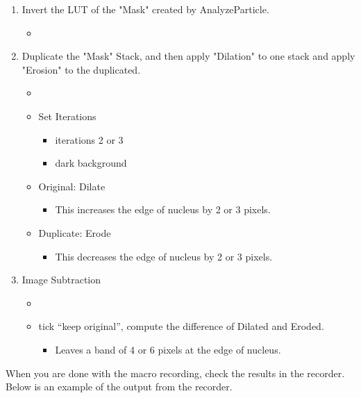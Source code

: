 \begin{enumerate}
\begin{itemize}
  \end{itemize}
  \item Invert the LUT of the "Mask" created by AnalyzeParticle. 
  \begin{itemize}
    \item {}
  \end{itemize}
  \item Duplicate the "Mask" Stack, and then apply "Dilation" to one stack and apply "Erosion" to the duplicated.
  \begin{itemize}
    \item {}
    \item Set Iterations 
    \begin{itemize}
      \item iterations 2 or 3
      \item dark background
    \end{itemize}
    \item Original: Dilate 
    \begin{itemize}
      \item This increases the edge of nucleus by 2 or 3 pixels. 
    \end{itemize}
    \item Duplicate: Erode 
    \begin{itemize}
      \item This decreases the edge of nucleus by 2 or 3 pixels. 
    \end{itemize}
  \end{itemize}
  \item Image Subtraction
  \begin{itemize}
    \item {}
    \item tick ``keep original'', compute the difference of Dilated and Eroded.
    \begin{itemize}
      \item Leaves a band of 4 or 6 pixels at the edge of nucleus. 
    \end{itemize} 
  \end{itemize}
\end{enumerate}

When you are done with the macro recording, check the results in the recorder. Below is an example of the output from the recorder. 

